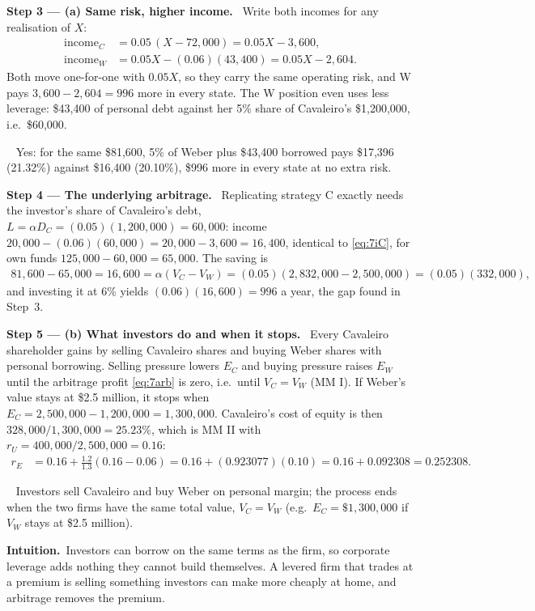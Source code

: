 \documentclass[11pt,a4paper]{article}
\numberwithin{equation}{section}
\newcommand{\step}[2]{\par\smallskip\noindent\textbf{Step #1 --- #2.}~}
\newcommand{\intuition}{\par\smallskip\noindent\textbf{Intuition.}~}
\newcommand{\answer}[1]{\par\smallskip\noindent\fbox{\textbf{Answer #1.}}~}
\begin{document}
\step{3}{(a) Same risk, higher income} Write both incomes for any realisation of $X$:
\begin{align}
  \text{income}_C &= 0.05\,(X-72{,}000) = 0.05X-3{,}600, \nonumber\\
  \text{income}_W &= 0.05X-(0.06)(43{,}400) = 0.05X-2{,}604. \nonumber
\end{align}
Both move one-for-one with $0.05X$, so they carry the same operating risk, and W pays
$3{,}600-2{,}604=996$ more in every state. The W position even uses less leverage: \$43{,}400 of
personal debt against her 5\% share of Cavaleiro's \$1{,}200{,}000, i.e.\ \$60{,}000.
\answer{(a)} Yes: for the same \$81{,}600, 5\% of Weber plus \$43{,}400 borrowed pays \$17{,}396
(21.32\%) against \$16{,}400 (20.10\%), \$996 more in every state at no extra risk.

\step{4}{The underlying arbitrage} Replicating strategy C exactly needs the investor's share of
Cavaleiro's debt, $L=\alpha D_C=(0.05)(1{,}200{,}000)=60{,}000$: income
$20{,}000-(0.06)(60{,}000)=20{,}000-3{,}600=16{,}400$, identical to \eqref{eq:7iC}, for own funds
$125{,}000-60{,}000=65{,}000$. The saving is
\begin{align}
  81{,}600-65{,}000 = 16{,}600 = \alpha (V_C-V_W) = (0.05)(2{,}832{,}000-2{,}500{,}000) = (0.05)(332{,}000), \label{eq:7arb}
\end{align}
and investing it at 6\% yields $(0.06)(16{,}600)=996$ a year, the gap found in Step~3.

\step{5}{(b) What investors do and when it stops} Every Cavaleiro shareholder gains by selling
Cavaleiro shares and buying Weber shares with personal borrowing. Selling pressure lowers $E_C$
and buying pressure raises $E_W$ until the arbitrage profit \eqref{eq:7arb} is zero, i.e.\ until
$V_C=V_W$ (MM I). If Weber's value stays at \$2.5 million, it stops when
$E_C=2{,}500{,}000-1{,}200{,}000=1{,}300{,}000$. Cavaleiro's cost of equity is then
$328{,}000/1{,}300{,}000=25.23\%$, which is MM II with $r_U=400{,}000/2{,}500{,}000=0.16$:
\begin{align}
  r_E &= 0.16+\tfrac{1.2}{1.3}(0.16-0.06) = 0.16+(0.923077)(0.10) = 0.16+0.092308 = 0.252308. \nonumber
\end{align}
\answer{(b)} Investors sell Cavaleiro and buy Weber on personal margin; the process ends when the
two firms have the same total value, $V_C=V_W$ (e.g.\ $E_C=\$1{,}300{,}000$ if $V_W$ stays at
\$2.5 million).

\intuition Investors can borrow on the same terms as the firm, so corporate leverage adds
nothing they cannot build themselves. A levered firm that trades at a premium is selling
something investors can make more cheaply at home, and arbitrage removes the premium.
\end{document}
